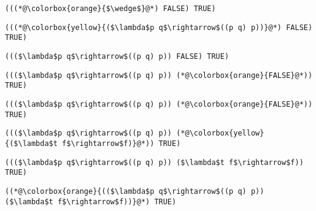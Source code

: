 \documentclass{beamer}
\begin{document}
\begin{frame}[fragile]{\CurrentSection}
\lstset{basicstyle=\ttfamily\small}\lstset{numbers=none}\lstset{language=ML}\begin{lstlisting}
(((*@\colorbox{orange}{$\wedge$}@*) FALSE) TRUE)
\end{lstlisting}
\pause\lstset{language=ML}\begin{lstlisting}
(((*@\colorbox{yellow}{($\lambda$p q$\rightarrow$((p q) p))}@*) FALSE) TRUE)
\end{lstlisting}

\end{frame}

\begin{frame}[fragile]{\CurrentSection}
\lstset{basicstyle=\ttfamily\small}\lstset{numbers=none}\lstset{language=ML}\begin{lstlisting}
((($\lambda$p q$\rightarrow$((p q) p)) FALSE) TRUE)
\end{lstlisting}
\pause\lstset{language=ML}\begin{lstlisting}
((($\lambda$p q$\rightarrow$((p q) p)) (*@\colorbox{orange}{FALSE}@*)) TRUE)
\end{lstlisting}

\end{frame}

\begin{frame}[fragile]{\CurrentSection}
\lstset{basicstyle=\ttfamily\small}\lstset{numbers=none}\lstset{language=ML}\begin{lstlisting}
((($\lambda$p q$\rightarrow$((p q) p)) (*@\colorbox{orange}{FALSE}@*)) TRUE)
\end{lstlisting}
\pause\lstset{language=ML}\begin{lstlisting}
((($\lambda$p q$\rightarrow$((p q) p)) (*@\colorbox{yellow}{($\lambda$t f$\rightarrow$f)}@*)) TRUE)
\end{lstlisting}

\end{frame}

\begin{frame}[fragile]{\CurrentSection}
\lstset{basicstyle=\ttfamily\small}\lstset{numbers=none}\lstset{language=ML}\begin{lstlisting}
((($\lambda$p q$\rightarrow$((p q) p)) ($\lambda$t f$\rightarrow$f)) TRUE)
\end{lstlisting}
\pause\lstset{language=ML}\begin{lstlisting}
((*@\colorbox{orange}{(($\lambda$p q$\rightarrow$((p q) p)) ($\lambda$t f$\rightarrow$f))}@*) TRUE)
\end{lstlisting}

\end{frame}
\end{document}
